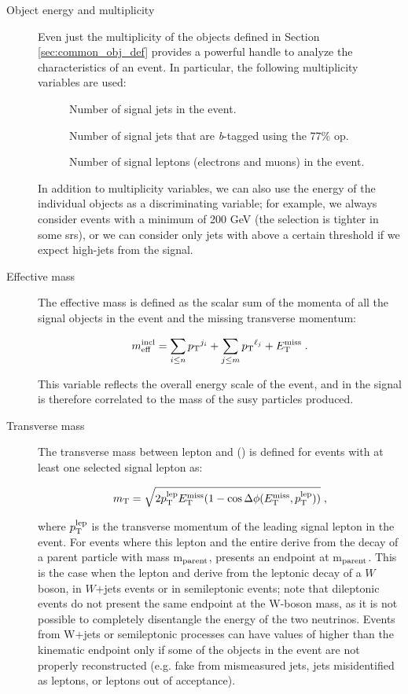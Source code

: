 \begin{description}
\item[Object energy and multiplicity] Even just the multiplicity of the objects defined in Section \ref{sec:common_obj_def} provides a powerful handle to analyze the characteristics of an event. In particular, the following multiplicity variables are used:

\begin{description}
\item[\njet] Number of signal jets in the event.
\item[\nbjet] Number of signal jets that are \textit{b}-tagged using the 77\% \gls{op}.
\item[\nlep] Number of signal leptons (electrons and muons) in the event.
\end{description}

\noindent In addition to multiplicity variables, we can also use the energy of the individual objects as a discriminating variable; 
for example, we always consider events with a minimum \met of 200 GeV (the selection is tighter in some \glspl{sr}), 
or we can consider only jets with \pt above a certain threshold if we expect high-\pt jets from the signal. 

\item[Effective mass] The effective mass is defined as the scalar sum of the momenta of all the signal objects in the event and the missing transverse momentum:

\begin{equation}
m_{\mathrm{eff}}^{\mathrm{incl}} = \sum_{i\leq n} {p_{\rm T}}^{j_i}  + \sum_{j\leq m} {p_{\rm T}}^{\ell_j}  + E_{\rm T}^{\mathrm{miss}} \; . \nonumber
\end{equation}

\noindent This variable reflects the overall energy scale of the event, and in the signal is therefore correlated to the mass of the \gls{susy} particles produced. 

\item[Transverse mass] The transverse mass between lepton and \met (\mt) is defined for events with at least one selected signal lepton as: 

\begin{equation}
m_\mathrm{T} = \sqrt{2p_{\rm T}^{\rm{lep}}E_{\rm T}^{\mathrm{miss}}(1-\cos\Delta\phi(E_{\rm T}^{\mathrm{miss}},p_{\rm T}^{\rm{lep}}))} \; , \nonumber
\end{equation}

\noindent where $p_{\rm T}^{\rm{lep}}$ is the transverse momentum of the leading signal lepton in the event. 
For events where this lepton and the entire \met derive from the decay of a parent particle with mass m$_{\rm{parent}}$, \mt presents an endpoint at m$_{\rm{parent}}$. 
This is the case when the lepton and \met derive from the leptonic decay of a $W$ boson, in $W$+jets events or in semileptonic \ttbar events; 
note that dileptonic \ttbar events do not present the same endpoint at the W-boson mass, as it is not possible to completely disentangle the energy of the two neutrinos. Events from W+jets or semileptonic \ttbar processes can have values of \mt higher than the kinematic endpoint only if some of the objects in the event are not properly reconstructed (e.g. fake \met from mismeasured jets, jets misidentified as leptons, or leptons out of acceptance).


\end{description}
